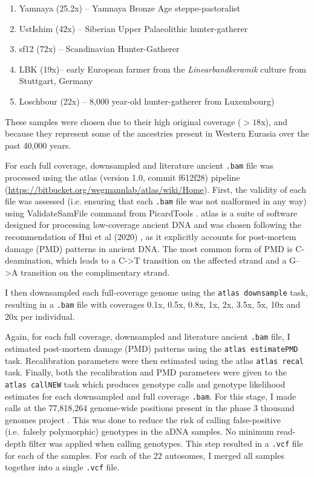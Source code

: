 {\begin{enumerate}
\item Yamnaya (25.2x) -- Yamnaya Bronze Age steppe-pastoralist \cite{deBarrosDamgaardeaar7711}
\item UstIshim (42x) -- Siberian Upper Palaeolithic hunter-gatherer \cite{Fu2014}
\item sf12 (72x) -- Scandinavian Hunter-Gatherer \cite{Gunther2018a}
\item LBK (19x)-- early European farmer from the \textit{Linearbandkeramik} culture from Stuttgart, Germany \cite{Lazaridis2014}
\item Loschbour (22x) -- 8,000 year-old hunter-gatherer from Luxembourg) \cite{Lazaridis2014}
\end{enumerate}

These samples were chosen due to their high original coverage ($>18$x), and because they represent some of the ancestries present in Western Eurasia over the past 40,000 years.  

For each full coverage, downsampled and literature ancient \texttt{.bam} file was processed using the atlas (version 1.0, commit f612f28) pipeline \cite{Link2017} \\(\url{https://bitbucket.org/wegmannlab/atlas/wiki/Home}). First, the validity of each file was assessed (i.e. ensuring that each \texttt{.bam} file was not malformed in any way) using ValidateSamFile command from PicardTools \cite{Picard2018toolkit}. atlas is a suite of software designed for processing low-coverage ancient DNA and was chosen following the recommendation of Hui et al (2020) \cite{hui2020evaluating}, as it explicitly accounts for post-mortem damage (PMD) patterns in ancient DNA. The most common form of PMD is C-deamination, which leads to a C->T transition on the affected strand and a G-->A transition on the complimentary strand.

I then downsampled each full-coverage genome using the \texttt{atlas downsample} task, resulting in a \texttt{.bam} file with coverages 0.1x, 0.5x, 0.8x, 1x, 2x, 3.5x, 5x, 10x and 20x per individual. 

Again, for each full coverage, downsampled and literature ancient \texttt{.bam} file, I estimated post-mortem damage (PMD) patterns using the \texttt{atlas estimatePMD} task. Recalibration parameters were then estimated using the atlas \texttt{atlas recal} task. Finally, both the recalibration and PMD parameters were given to the \texttt{atlas callNEW} task which produces genotype calls and genotype likelihood estimates for each downsampled and full coverage \texttt{.bam}. For this stage, I made calls at the 77,818,264 genome-wide positions present in the phase 3 thousand genomes project \cite{1000GenomesProjectConsortium2015}. This was done to reduce the risk of calling false-positive (i.e.\ falsely polymorphic) genotypes in the aDNA samples. No minimum read-depth filter was applied when calling genotypes. This step resulted in a \texttt{.vcf} file for each of the samples. For each of the 22 autosomes, I merged all samples together into a single \texttt{.vcf} file. 

}
